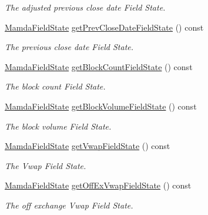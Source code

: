 \begin{CompactItemize}
\begin{CompactList}\small\item\em The adjusted previous close date Field State. \item\end{CompactList}\item 
\hyperlink{namespaceWombat_93aac974f2ab713554fd12a1fa3b7d2a}{Mamda\-Field\-State} \hyperlink{classWombat_1_1MamdaTradeListener_280ff9e5c40998c03f12a789fe90613f}{get\-Prev\-Close\-Date\-Field\-State} () const 
\begin{CompactList}\small\item\em The previous close date Field State. \item\end{CompactList}\item 
\hyperlink{namespaceWombat_93aac974f2ab713554fd12a1fa3b7d2a}{Mamda\-Field\-State} \hyperlink{classWombat_1_1MamdaTradeListener_0fd74766b284afb545bd976dc7c84060}{get\-Block\-Count\-Field\-State} () const 
\begin{CompactList}\small\item\em The block count Field State. \item\end{CompactList}\item 
\hyperlink{namespaceWombat_93aac974f2ab713554fd12a1fa3b7d2a}{Mamda\-Field\-State} \hyperlink{classWombat_1_1MamdaTradeListener_4bff1adf74e14f18819160029796fa9d}{get\-Block\-Volume\-Field\-State} () const 
\begin{CompactList}\small\item\em The block volume Field State. \item\end{CompactList}\item 
\hyperlink{namespaceWombat_93aac974f2ab713554fd12a1fa3b7d2a}{Mamda\-Field\-State} \hyperlink{classWombat_1_1MamdaTradeListener_c21118c78e3c119f6009e90ff1dfa922}{get\-Vwap\-Field\-State} () const 
\begin{CompactList}\small\item\em The Vwap Field State. \item\end{CompactList}\item 
\hyperlink{namespaceWombat_93aac974f2ab713554fd12a1fa3b7d2a}{Mamda\-Field\-State} \hyperlink{classWombat_1_1MamdaTradeListener_218b607fb4f815873eea2fc4da9f4f8c}{get\-Off\-Ex\-Vwap\-Field\-State} () const 
\begin{CompactList}\small\item\em The off exchange Vwap Field State. \item\end{CompactList}\item 

\end{CompactItemize}
